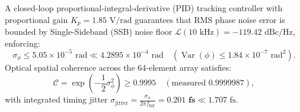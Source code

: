 \documentclass[11pt,onecolumn]{article}
\begin{document}
\begin{enumerate}
\begin{equation}
    \label{eq:hbt_collector_voltage}
    \end{equation}
    A closed-loop proportional-integral-derivative (PID) tracking controller with proportional gain $K_p = 1.85\text{ V/rad}$ guarantees that RMS phase noise error is bounded by Single-Sideband (SSB) noise floor $\mathcal{L}(10\text{ kHz}) = -119.42\text{ dBc/Hz}$, enforcing:
    \begin{equation}
    \sigma_\phi \le 5.05 \times 10^{-5}\text{ rad} \ll 4.2895 \times 10^{-4}\text{ rad} \quad (\operatorname{Var}(\phi) \le 1.84 \times 10^{-7}\text{ rad}^2).
    \end{equation}
    Optical spatial coherence across the 64-element array satisfies:
    \begin{equation}
    \mathcal{C} = \exp\left(-\frac{1}{2}\sigma_\phi^2\right) \ge \mathbf{0.9995} \quad (\text{measured } 0.9999987),
    \end{equation}
    with integrated timing jitter $\sigma_{\text{jitter}} = \frac{\sigma_\phi}{2\pi f_{\text{RF}}} = \mathbf{0.201\text{ fs}} \ll 1.707\text{ fs}$.
\end{enumerate}
\end{document}
